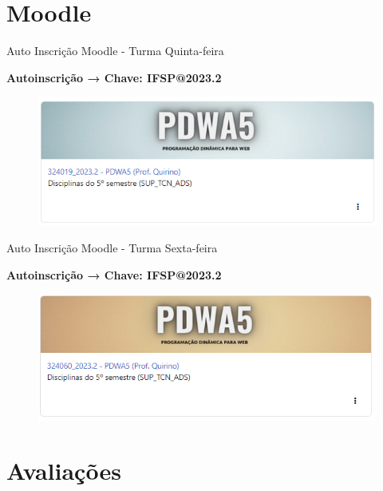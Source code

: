 \documentclass{beamer}
\begin{document}
\section{Moodle}

\begin{frame}[fragile]{Auto Inscrição Moodle - Turma Quinta-feira}

      \textbf{Autoinscrição → \textcolor{sintefred}{Chave: IFSP@2023.2}}

      \begin{figure}[H]
            \centerline{\includegraphics[width=1\textwidth]{assets/aula-tads-pdwa5/moodle_quinta.png}}
            
        \end{figure}
        
\end{frame}

\begin{frame}[fragile]{Auto Inscrição Moodle - Turma Sexta-feira}

      \textbf{Autoinscrição → \textcolor{sintefred}{Chave: IFSP@2023.2}}
        \begin{figure}[H]
            \centerline{\includegraphics[width=1\textwidth]{assets/aula-tads-pdwa5/moodle_sexta.png}}
            
        \end{figure}
\end{frame}

\section{Avaliações}
\end{document}
